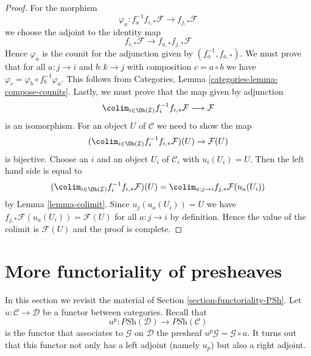 \begin{proof}
For the morphism
$$
\varphi_a : f_a^{-1}f_{i, *}\mathcal{F} \to f_{j, *}\mathcal{F}
$$
we choose the adjoint to the identity map
$$
f_{i, *}\mathcal{F} \to f_{a, *}f_{j, *}\mathcal{F}
$$
Hence $\varphi_a$ is the counit for the adjunction given by
$(f_a^{-1}, f_{a, *})$. We must prove that for all
$a : j \to i$ and $b : k \to j$ with composition $c = a \circ b$
we have
$\varphi_c = \varphi_b \circ f_b^{-1}\varphi_a$.
This follows from Categories, Lemma \ref{categories-lemma-compose-counits}.
Lastly, we must prove that the map given by adjunction
$$
\colim_{i \in \Ob(\mathcal{I})} f_i^{-1}f_{i, *}\mathcal{F}
\longrightarrow
\mathcal{F}
$$
is an isomorphism. For an object $U$ of $\mathcal{C}$
we need to show the map
$$
(\colim_{i \in \Ob(\mathcal{I})} f_i^{-1}f_{i, *}\mathcal{F})(U) \to \mathcal{F}(U)
$$
is bijective. Choose an $i$ and an object $U_i$ of $\mathcal{C}_i$
with $u_i(U_i) = U$. Then the left hand side is equal to
$$
(\colim_{i \in \Ob(\mathcal{I})} f_i^{-1}f_{i, *}\mathcal{F})(U) =
\colim_{a : j \to i} f_{j, *}\mathcal{F}(u_a(U_i))
$$
by Lemma \ref{lemma-colimit}. Since $u_j(u_a(U_i)) = U$
we have $f_{j, *}\mathcal{F}(u_a(U_i)) = \mathcal{F}(U)$
for all $a : j \to i$ by definition. Hence the value of the colimit is
$\mathcal{F}(U)$ and the proof is complete.
\end{proof}











\section{More functoriality of presheaves}
\label{section-more-functoriality-PSh}

\noindent
In this section we revisit the material of
Section \ref{section-functoriality-PSh}.
Let $u : \mathcal{C} \to \mathcal{D}$ be a functor between categories.
Recall that
$$
u^p :
\textit{PSh}(\mathcal{D})
\longrightarrow
\textit{PSh}(\mathcal{C})
$$
is the functor that associates to $\mathcal{G}$ on $\mathcal{D}$ the presheaf
$u^p\mathcal{G} = \mathcal{G} \circ u$. It turns out that this functor
not only has a left adjoint (namely $u_p$) but also a right adjoint.

